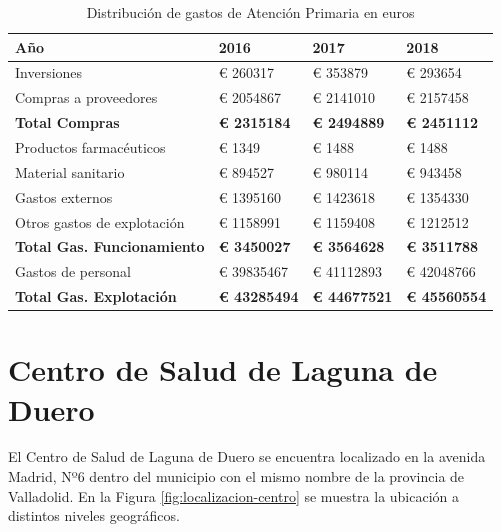 \begin{table}[H]
    \centering
    \begin{tabular}{llll}
        \toprule
        Año                                & 2016                & 2017                & 2018                \\
        \midrule
        Inversiones                        & € 260317            & € 353879            & € 293654            \\
        Compras a proveedores              & € 2054867           & € 2141010           & € 2157458           \\
        \textbf{Total Compras}             & \textbf{€ 2315184}  & \textbf{€ 2494889}  & \textbf{€ 2451112}  \\
        \midrule
        Productos farmacéuticos            & € 1349              & € 1488              & € 1488              \\
        Material sanitario                 & € 894527            & € 980114            & € 943458            \\
        Gastos externos                    & € 1395160           & € 1423618           & € 1354330           \\
        Otros gastos de explotación        & € 1158991           & € 1159408           & € 1212512           \\
        \textbf{Total Gas. Funcionamiento} & \textbf{€ 3450027}  & \textbf{€ 3564628}  & \textbf{€ 3511788}  \\
        \midrule
        Gastos de personal                 & € 39835467          & € 41112893          & € 42048766          \\
        \textbf{Total Gas. Explotación}    & \textbf{€ 43285494} & \textbf{€ 44677521} & \textbf{€ 45560554} \\
        \bottomrule
    \end{tabular}
    \caption{Distribución de gastos de Atención Primaria en euros}
    \label{tab:gastos-primaria}
\end{table}

\section{Centro de Salud de Laguna de Duero}

El Centro de Salud de Laguna de Duero se encuentra localizado en la avenida Madrid, Nº6 dentro del municipio con el mismo nombre de la provincia de Valladolid. En la Figura \ref{fig:localizacion-centro} se muestra la ubicación a distintos niveles geográficos.

